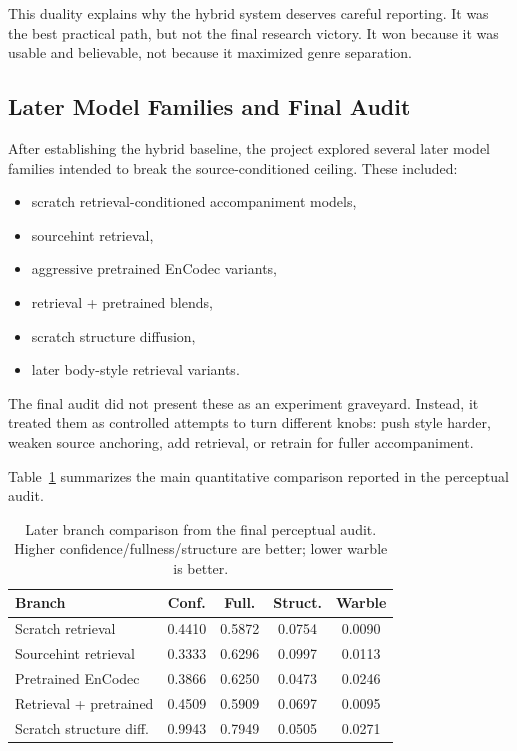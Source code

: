 \documentclass[conference]{IEEEtran}
\begin{document}
This duality explains why the hybrid system deserves careful reporting. It was the best practical path, but not the final research victory. It won because it was usable and believable, not because it maximized genre separation.

\subsection{Later Model Families and Final Audit}
After establishing the hybrid baseline, the project explored several later model families intended to break the source-conditioned ceiling. These included:
\begin{itemize}[leftmargin=1.5em]
    \item scratch retrieval-conditioned accompaniment models,
    \item sourcehint retrieval,
    \item aggressive pretrained EnCodec variants,
    \item retrieval + pretrained blends,
    \item scratch structure diffusion,
    \item later body-style retrieval variants.
\end{itemize}

The final audit did not present these as an experiment graveyard. Instead, it treated them as controlled attempts to turn different knobs: push style harder, weaken source anchoring, add retrieval, or retrain for fuller accompaniment.

Table~\ref{tab:audit} summarizes the main quantitative comparison reported in the perceptual audit.

\begin{table}[t]
\caption{Later branch comparison from the final perceptual audit. Higher confidence/fullness/structure are better; lower warble is better.}
\label{tab:audit}
\centering
\small
\begin{tabular}{@{}p{2.0cm}cccc@{}}
\toprule
\textbf{Branch} & \textbf{Conf.} & \textbf{Full.} & \textbf{Struct.} & \textbf{Warble} \\
\midrule
Scratch retrieval & 0.4410 & 0.5872 & 0.0754 & 0.0090 \\
Sourcehint retrieval & 0.3333 & 0.6296 & 0.0997 & 0.0113 \\
Pretrained EnCodec & 0.3866 & 0.6250 & 0.0473 & 0.0246 \\
Retrieval + pretrained & 0.4509 & 0.5909 & 0.0697 & 0.0095 \\
Scratch structure diff. & 0.9943 & 0.7949 & 0.0505 & 0.0271 \\
\bottomrule
\end{tabular}
\end{table}
\end{document}
